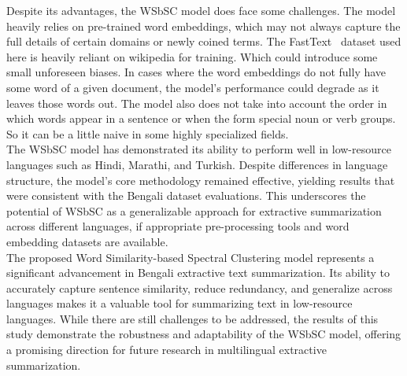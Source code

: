 Despite its advantages, the WSbSC model does face some challenges.
The model heavily relies on pre-trained word embeddings,
which may not always capture the full details of certain domains or newly coined terms.
The FastText~\cite{grave-etal-2018-fasttext} dataset used here is
heavily reliant on wikipedia for training.
Which could introduce some small unforeseen biases.
In cases where the word embeddings do not fully have some word of a given document,
the model’s performance could degrade as it leaves those words out.
The model also does not take into account the order in which words appear in a sentence
or when the form special noun or verb groups.
So it can be a little naive in some highly specialized fields.\\

The WSbSC model has demonstrated its ability to perform well in low-resource languages
such as Hindi, Marathi, and Turkish.
Despite differences in language structure, the model’s core methodology remained effective,
yielding results that were consistent with the Bengali dataset evaluations.
This underscores the potential of WSbSC as a generalizable approach
for extractive summarization across different languages, if
appropriate pre-processing tools and word embedding datasets are available.\\

The proposed Word Similarity-based Spectral Clustering model represents a
significant advancement in Bengali extractive text summarization.
Its ability to accurately capture sentence similarity, reduce redundancy, and generalize
across languages makes it a valuable tool for summarizing text in low-resource languages.
While there are still challenges to be addressed, the results of this study demonstrate the
robustness and adaptability of the WSbSC model, offering a promising direction for future research
in multilingual extractive summarization.

